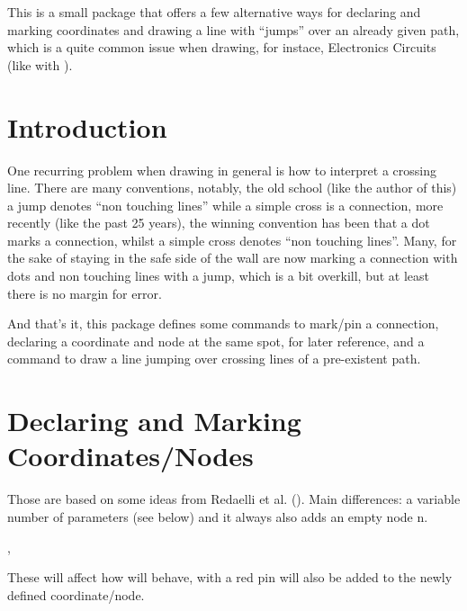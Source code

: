 \documentclass[10pt]{article}
\begin{document}
  
\begin{typesetabstract}

This is a small package that offers a few alternative ways for declaring and marking coordinates and drawing a line with ``jumps'' over an already given path, which is a quite common issue when drawing, for instace, Electronics Circuits (like with ).
\end{typesetabstract}


\section{Introduction}
One recurring problem when drawing in general is how to interpret a crossing line. There are many conventions, notably, the old school (like the author of this) a jump denotes ``non touching lines'' while a simple cross is a connection, more recently (like the past 25 years), the winning convention has been that a dot marks a connection, whilst a simple cross denotes ``non touching lines''. Many, for the sake of staying in the safe side of the wall are now marking a connection with dots and non touching lines with a jump, which is a bit overkill, but at least there is no margin for error.

And that's it, this package defines some commands to mark/pin a connection, declaring a coordinate and node at the same spot, for later reference, and a command to draw a line jumping over crossing lines of a pre-existent path.



\section{Declaring and Marking Coordinates/Nodes}\label{coord}
Those are based on some ideas from Redaelli et al. (). Main differences: a variable number of parameters (see below) and it always also adds an empty node n.
\begin{codedescribe}{\showcoordstrue,\shoocoordsfalse}
\begin{codesyntax}%
\tsmacro{\showcoordstrue}{}
\tsmacro{\showcoordsfalse}{}
\end{codesyntax}
These will affect how \tsobj{\ncoord,\dotcoord,\odotcoord} will behave, with \tsobj{\showcoordstrue} a red pin will also be added to the newly defined coordinate/node.
\end{codedescribe}
\end{document}
